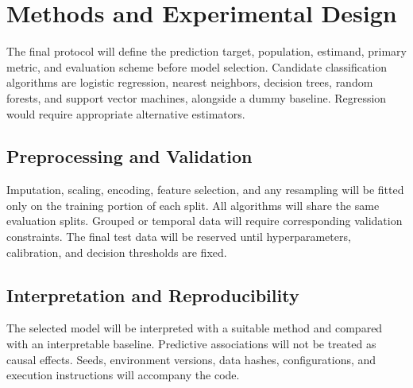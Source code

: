 \section{Methods and Experimental Design}
The final protocol will define the prediction target, population, estimand,
primary metric, and evaluation scheme before model selection. Candidate
classification algorithms are logistic regression, nearest neighbors,
decision trees, random forests, and support vector machines, alongside a
dummy baseline. Regression would require appropriate alternative estimators.
\subsection{Preprocessing and Validation}
Imputation, scaling, encoding, feature selection, and any resampling will
be fitted only on the training portion of each split. All algorithms will
share the same evaluation splits. Grouped or temporal data will require
corresponding validation constraints. The final test data will be reserved
until hyperparameters, calibration, and decision thresholds are fixed.
\subsection{Interpretation and Reproducibility}
The selected model will be interpreted with a suitable method and compared
with an interpretable baseline. Predictive associations will not be treated
as causal effects. Seeds, environment versions, data hashes, configurations,
and execution instructions will accompany the code.
